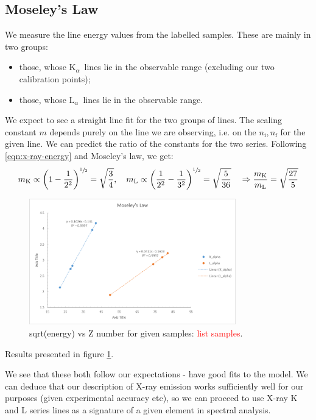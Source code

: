 \documentclass[11pt,a4paper,twoside,onecolumn]{article}
\newcommand{\reminder}[1]{\textcolor{red}{#1}}
\newcommand{\Kalpha}{$\mathrm{K}_\alpha$~}
\newcommand{\Lalpha}{$\mathrm{L}_\alpha$~}
\begin{document}
\subsection{Moseley's Law}
We measure the line energy values from the labelled samples. These are mainly in two groups:
\begin{itemize}[noitemsep]
    \item those, whose \Kalpha lines lie in the observable range (excluding our two calibration points);
    \item those, whose \Lalpha lines lie in the observable range.
\end{itemize}
We expect to see a straight line fit for the two groups of lines. The scaling constant $m$ depends purely on the line we are observing, i.e. on the $n_\mathrm{i}, n_\mathrm{f}$ for the given line. We can predict the ratio of the constants for the two series. Following \eqref{eqn:x-ray-energy} and Moseley's law, we get:
\begin{equation}
    m_\mathrm{K} \propto \left(1 - \frac{1}{2^2}\right)^{\sfrac{1}{2}} = \sqrt{\frac{3}{4}},\quad m_\mathrm{L} \propto \left(\frac{1}{2^2} - \frac{1}{3^2}\right)^{\sfrac{1}{2}} = \sqrt{\frac{5}{36}} \quad \Rightarrow \frac{m_\mathrm{K}}{m_\mathrm{L}} = \sqrt{\frac{27}{5}}
\end{equation}
\begin{figure}[!htb]
    \centering
    \includegraphics[width=0.8\textwidth]{img/moseleys.png}
    \caption{sqrt(energy) vs Z number for given samples: \reminder{list samples}.}\label{fig:moseleys}
\end{figure}


Results presented in figure \ref{fig:moseleys}.

We see that these both follow our expectations - have good fits to the model. We can deduce that our description of X-ray emission works sufficiently well for our purposes (given experimental accuracy etc), so we can proceed to use X-ray K and L series lines as a signature of a given element in spectral analysis.
\end{document}
